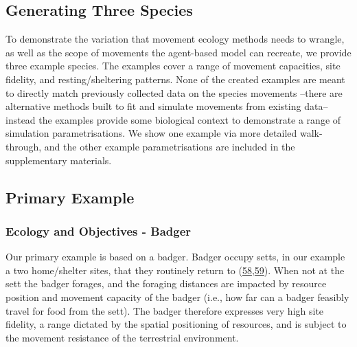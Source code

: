 \documentclass[10pt,a4paper]{article}
\begin{document}
\hypertarget{generating-three-species}{%
\subsection{Generating Three Species}\label{generating-three-species}}

To demonstrate the variation that movement ecology methods needs to wrangle, as well as the scope of movements the agent-based model can recreate, we provide three example species.
The examples cover a range of movement capacities, site fidelity, and resting/sheltering patterns.
None of the created examples are meant to directly match previously collected data on the species movements --there are alternative methods built to fit and simulate movements from existing data-- instead the examples provide some biological context to demonstrate a range of simulation parametrisations.
We show one example via more detailed walk-through, and the other example parametrisations are included in the supplementary materials.

\hypertarget{primary-example}{%
\subsection{Primary Example}\label{primary-example}}

\hypertarget{ecology-and-objectives---badger}{%
\subsubsection{Ecology and Objectives - Badger}\label{ecology-and-objectives---badger}}

Our primary example is based on a badger.
Badger occupy setts, in our example a two home/shelter sites, that they routinely return to (\protect\hyperlink{ref-kowalczyk_daily_2006}{58},\protect\hyperlink{ref-feore_habitat_1999}{59}).
When not at the sett the badger forages, and the foraging distances are impacted by resource position and movement capacity of the badger (i.e., how far can a badger feasibly travel for food from the sett).
The badger therefore expresses very high site fidelity, a range dictated by the spatial positioning of resources, and is subject to the movement resistance of the terrestrial environment.
\end{document}
